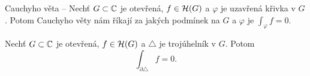 \begin{note}
Cauchyho věta -- Nechť $G \subset \operatorname{\mathbb{C}}  $ je otevřená, $f \in \operatorname{\mathcal{H}} (G)$ a $\varphi$ je uzavřená křivka v $G$. Potom Cauchyho věty nám říkají za jakých podmínek na $G$ a $\varphi$ je $\int_\varphi f=0$.
\end{note}%

\begin{theorem}\label{thm:goursat}
Nechť $G \subset \operatorname{\mathbb{C}}  $ je otevřená, $f \in \operatorname{\mathcal{H}} (G)$ a $\triangle$ je trojúhelník v $G$. Potom
\begin{equation}
    \int_{\partial\triangle}f=0\text{.}
\end{equation} 
\end{theorem}

